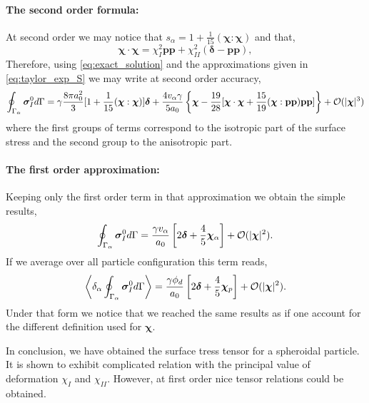 \paragraph{The second order formula: }
At second order we may notice that $s_\alpha =  1 + \frac{1}{15}(\bm\chi:\bm\chi)$ and that,
\begin{equation*}
    \bm\chi\cdot\bm\chi
    = 
    \chi_I^2 \textbf{pp}
    + 
    \chi_{II}^2 (\bm\delta - \textbf{pp}),
\end{equation*}
Therefore, using \ref{eq:exact_solution} and the approximations given in \ref{eq:taylor_exp_S} we may write at second order accuracy, 
\begin{align}
    \oint_{\Gamma_{\alpha}} \bm\sigma_I^0 d\Gamma
    = 
    \gamma \frac{8\pi a_0^2}{3} [
        1
        +
        \frac{1}{15}
        (\bm\chi:\bm\chi)
    ] 
    \bm\delta  
    + 
    \frac{4 v_\alpha \gamma}{5 a_0} \left\{
        \bm\chi
        - \frac{19}{28} [\bm\chi \cdot \bm\chi
        + \frac{15}{19}(\bm\chi:\textbf{pp})\textbf{pp}]
    \right\}
    +\mathcal{O}(|\bm\chi|^3)
    \label{eq:app2_formula}
\end{align}
where the first groups of terms correspond to the isotropic part of the surface stress and the second group to the anisotropic part. 


\paragraph*{The first order approximation:}
Keeping only the first order term in that approximation we obtain the simple results,
\begin{align}
    \oint_{\Gamma_{\alpha}} \bm\sigma_I^0 d\Gamma
    = 
    \frac{\gamma v_\alpha }{a_0} \left[
        2\bm\delta  
        + 
        \frac{4}{5} 
        \bm\chi_\alpha
        \right]
    +\mathcal{O}(|\bm\chi|^2).
    \label{eq:app1_formula}
\end{align}
If we average over all particle configuration this term reads, 
\begin{align}
    \left<\delta_\alpha \oint_{\Gamma_{\alpha}} \bm\sigma_I^0 d\Gamma\right>
    = 
    \frac{\gamma \phi_d }{a_0} \left[
        2\bm\delta  
        + 
        \frac{4}{5} 
        \bm\chi_p
        \right]
    +\mathcal{O}(|\bm\chi|^2).
\end{align}
Under that form we notice that we reached the same results as \citet{lhuillier1987phenomenology} if one account for the different definition used for $\bm\chi$. 


In conclusion, we have obtained the surface tress tensor for a spheroidal particle. 
It is shown to exhibit complicated relation with the principal value of deformation $\chi_I$ and $\chi_{II}$.
However, at first order nice tensor relations could be obtained. 

